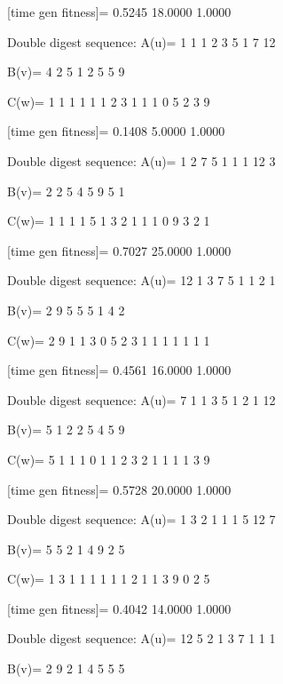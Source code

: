 [time gen fitness]=
    0.5245   18.0000    1.0000

Double digest sequence:
A(u)=
     1     1     1     2     3     5     1     7    12

B(v)=
     4     2     5     1     2     5     5     9

C(w)=
     1     1     1     1     1     1     2     3     1     1     1     0     5     2     3     9

[time gen fitness]=
    0.1408    5.0000    1.0000

Double digest sequence:
A(u)=
     1     2     7     5     1     1     1    12     3

B(v)=
     2     2     5     4     5     9     5     1

C(w)=
     1     1     1     1     5     1     3     2     1     1     1     0     9     3     2     1

[time gen fitness]=
    0.7027   25.0000    1.0000

Double digest sequence:
A(u)=
    12     1     3     7     5     1     1     2     1

B(v)=
     2     9     5     5     5     1     4     2

C(w)=
     2     9     1     1     3     0     5     2     3     1     1     1     1     1     1     1

[time gen fitness]=
    0.4561   16.0000    1.0000

Double digest sequence:
A(u)=
     7     1     1     3     5     1     2     1    12

B(v)=
     5     1     2     2     5     4     5     9

C(w)=
     5     1     1     1     0     1     1     2     3     2     1     1     1     1     3     9

[time gen fitness]=
    0.5728   20.0000    1.0000

Double digest sequence:
A(u)=
     1     3     2     1     1     1     5    12     7

B(v)=
     5     5     2     1     4     9     2     5

C(w)=
     1     3     1     1     1     1     1     1     2     1     1     3     9     0     2     5

[time gen fitness]=
    0.4042   14.0000    1.0000

Double digest sequence:
A(u)=
    12     5     2     1     3     7     1     1     1

B(v)=
     2     9     2     1     4     5     5     5

